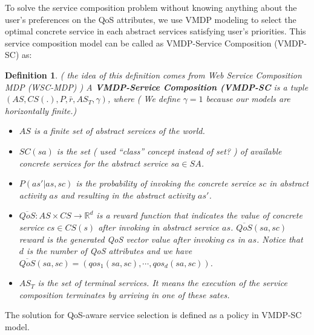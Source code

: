 \documentclass{sigchi}
\newtheorem{definition}{Definition}
\begin{document}
To solve the service composition problem without knowing anything about the user's preferences on the QoS attributes, we use VMDP modeling to select the optimal concrete service in each abstract services satisfying user's priorities. This service composition model can be called as VMDP-Service Composition (VMDP-SC) as:

\begin{definition}
({\color{blue} the idea of this definition comes from Web Service Composition MDP (WSC-MDP) \cite{DBLP:conf/icsoc/MoustafaZ13,Wang2010}}) A \textbf{VMDP-Service Composition (VMDP-SC} is a tuple $(AS, CS(.), P, \bar{r}, AS_T, \gamma)$, where ({\color{red} We define $\gamma = 1$ because our models are horizontally finite.}) 

\begin{itemize}
\item[-] $AS$ is a finite set of abstract services of the world.
\item[-] $SC(sa)$ is the set ({ \color{red} \cite{DBLP:journals/tase/KhanoucheACKY16} used ``class'' concept instead of set? }) of available concrete services for the abstract service $sa \in SA$.
\item[-] $P(as' |as, sc )$ is the probability of invoking the concrete service $sc$ in abstract activity $as$ and resulting in the abstract activity $as'$.
\item[-] $ \overline{QoS}: AS \times CS \longrightarrow \mathbb{R}^d$ is a reward function that indicates the value of concrete service $cs \in CS(s)$ after invoking in abstract service $as$. $\overline{QoS}(sa, sc)$ reward is the generated QoS vector value after invoking $cs$ in $as$. Notice that $d$ is the number of QoS attributes and we have $\overline{QoS}(sa, sc) = (qos_1(sa,sc), \cdots, qos_d(sa,sc))$. 
\item[-] $AS_T$ is the set of terminal services. It means the execution of the service composition terminates by arriving in one of these sates.
\end{itemize}
\end{definition}

The solution for QoS-aware service selection is defined as a policy in VMDP-SC model.
\end{document}
